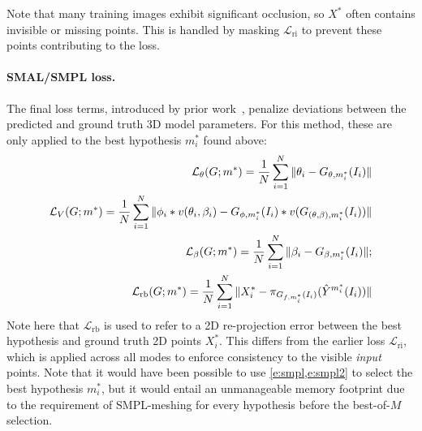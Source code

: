 Note that many training images exhibit significant occlusion, so $X^*$ often contains invisible or missing points. This is handled by masking $\mathcal{L}_\text{ri}$ to prevent these points contributing to the loss.

\paragraph{SMAL/SMPL loss.}
The final loss terms, introduced by prior work~\cite{kanazawa18end-to-end,pavlakos18learning,kolotouros19learning}, penalize
deviations between the predicted and ground truth 3D model parameters.
For this method, these are only applied to the best hypothesis $m_i^*$ found above:
{\small
\begin{align}
\mathcal{L}_\theta(G;m^*) = \frac{1}{N}
  \sum_{i=1}^N \| \theta_i - G_{\theta,m_i^*}(I_i)\| \\
\mathcal{L}_V(G;m^*) = \frac{1}{N} \label{e:smpl}
  \sum_{i=1}^N \| \phi_i * v(\theta_i, \beta_i) - G_{\phi,m_i^*}(I_i)*v(G_{(\theta,\beta),m_i^*}(I_i))\| \\
\mathcal{L}_\beta(G;m^*) = \frac{1}{N}
  \sum_{i=1}^N \| \beta_i - G_{\beta,m_i^*}(I_i)\|; \\
\mathcal{L}_\text{rb}(G;m^*) = \frac{1}{N} \label{e:smpl2}
  \sum_{i=1}^N \| X^*_i - \pi_{G_{f,m_i^*}(I_i)}(\hat{Y}^{m_i^*}(I_i))\|
\end{align}}%
Note here that $\mathcal{L}_\text{rb}$ is used to refer to a 2D re-projection error between the best hypothesis and ground truth 2D points $X^*_i$. This differs from the earlier loss $\mathcal{L}_\text{ri}$, which is applied across all modes to enforce consistency to the visible \emph{input} points. Note that it would have been possible to use \cref{e:smpl,e:smpl2} to select the best hypothesis $m_i^*$, but it would entail an unmanageable memory footprint due to the requirement of SMPL-meshing for every hypothesis before the best-of-$M$ selection. 

